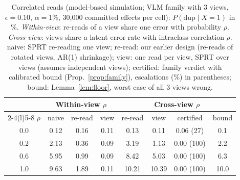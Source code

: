 \begin{table}[!htbp]
\centering
\caption{Correlated reads (model-based simulation; VLM family with 3 views, $\epsilon{=}0.10$, $\alpha{=}1\%$, 30{,}000 committed effects per cell):
$P(\mathrm{dup}\mid X{=}1)$ in \%. \emph{Within-view}: re-reads of a view share one error with probability $\rho$.
\emph{Cross-view}: views share a latent error rate with intraclass correlation $\rho$. naive: SPRT re-reading one view; re-read: our earlier design
(re-reads of rotated views, AR(1) shrinkage); view: one read per view, SPRT over views (assumes independent views); certified: family verdict with calibrated bound (Prop.~\ref{prop:family}),
escalations (\%) in parentheses; bound: Lemma~\ref{lem:floor}, worst case of all 3 views wrong.}
\label{tab:corr}
\footnotesize
\setlength{\tabcolsep}{2pt}
\begin{tabular}{@{}c ccc cccc@{}}
\toprule
 & \multicolumn{3}{c}{Within-view $\rho$} & \multicolumn{4}{c}{Cross-view $\rho$} \\
\cmidrule(lr){2-4}\cmidrule(l){5-8}
$\rho$ & naive & re-read & view & re-read & view & certified & bound \\
\midrule
0.0 & 0.12 & 0.16 & 0.11 & 0.13 & 0.11 & 0.06 (27) & 0.1 \\
0.2 & 2.13 & 0.36 & 0.09 & 3.19 & 1.13 & 0.00 (100) & 2.2 \\
0.6 & 5.95 & 0.99 & 0.09 & 8.42 & 5.03 & 0.00 (100) & 6.3 \\
1.0 & 9.63 & 1.89 & 0.11 & 10.21 & 10.39 & 0.00 (100) & 10.0 \\
\bottomrule
\end{tabular}
\end{table}
